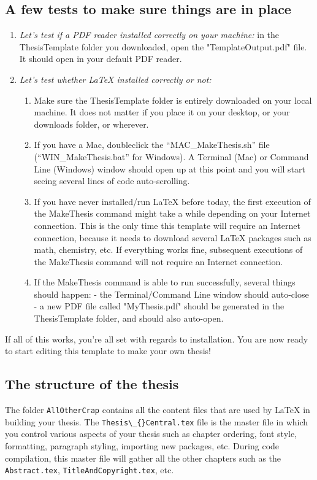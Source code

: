 \documentclass[12pt]{report} %
\begin{document}
\subsection*{A few tests to make sure things are in place}
\begin{enumerate}
\item \textit{Let's test if a PDF reader installed correctly on your machine:} in the ThesisTemplate folder you downloaded, open the "TemplateOutput.pdf" file. It should open in your default PDF reader.
\item \textit{Let's test whether LaTeX installed correctly or not:}
\begin{enumerate}
\item Make sure the ThesisTemplate folder is entirely downloaded on your local machine. It does not matter if you place it on your desktop, or your downloads folder, or wherever.
\item If you have a Mac, doubleclick the ``MAC\_{}MakeThesis.sh'' file (``WIN\_{}MakeThesis.bat'' for Windows). A Terminal (Mac) or Command Line (Windows) window should open up at this point and you will start seeing several lines of code auto-scrolling.
\item If you have never installed/run \LaTeX{} before today, the first execution of the MakeThesis command might take a while depending on your Internet connection. This is the only time this template will require an Internet connection, because it needs to download several \LaTeX{} packages such as math, chemistry, etc. If everything works fine, subsequent executions of the MakeThesis command will not require an Internet connection.
\item If the MakeThesis command is able to run successfully, several things should happen:
- the Terminal/Command Line window should auto-close
- a new PDF file called "MyThesis.pdf" should be generated in the ThesisTemplate folder, and should also auto-open.
\end{enumerate}

\end{enumerate}
If all of this works, you're all set with regards to installation. You are now ready to start editing this template to make your own thesis!

\subsection*{The structure of the thesis}
The folder \verb|AllOtherCrap| contains all the content files that are used by \LaTeX{} in building your thesis. The \verb|Thesis\_{}Central.tex| file is the master file in which you control various aspects of your thesis such as chapter ordering, font style, formatting, paragraph styling, importing new packages, etc. During code compilation, this master file will gather all the other chapters such as the \verb|Abstract.tex|, \verb|TitleAndCopyright.tex|, etc.
\end{document}
